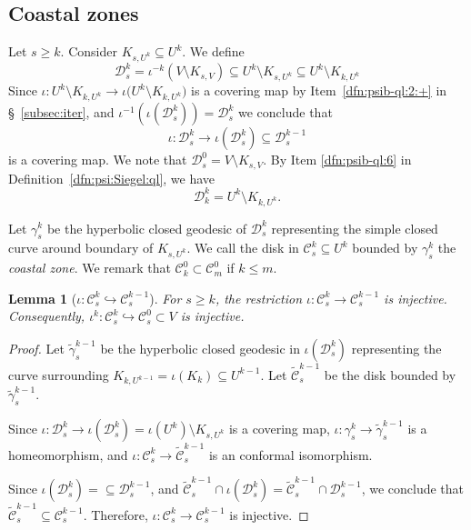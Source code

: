 \documentclass{amsart}
\newcommand{\1}{{\mathbb 1 }}
\newcommand\DD{\mathcal{D}}
\newtheorem{lem}[thm]{Lemma}
\theoremstyle{remark}
\numberwithin{equation}{section}
\theoremstyle{definition}
\newcommand{\CC}{{\mathcal C}}
\begin{document}
\subsection{Coastal zones}\label{subsec:coastal}
Let $s \geq k$. Consider $K_{s, U^k} \subseteq U^k$.
We define 
$$
\DD^k_s = \iota^{-k}(V \setminus K_{s, V}) \subseteq U^k \setminus K_{s, U^k} \subseteq U^k \setminus K_{k, U^k}
$$
Since $\iota: U^k \setminus K_{k, U^k} \longrightarrow \iota\big( U^{k}\setminus  K_{k, U^k}\big)$ is a covering map by Item~\ref{dfn:psib-ql:2:+} in \S~\ref{subsec:iter}, and $\iota^{-1}(\iota(\DD^k_s)) = \DD^k_s$ we conclude that
$$
\iota: \DD^k_s \longrightarrow \iota(\DD^k_s) \subseteq \DD^{k-1}_s
$$
is a covering map.
We note that $\DD^0_s = V \setminus K_{s, V}$. 
By Item \ref{dfn:psib-ql:6} in Definition~\ref{dfn:psi:Siegel:ql}, we have
\begin{equation}\label{eq:D^k_k}
    \DD^k_k = U^k \setminus K_{k, U^k}.
\end{equation}


Let $\gamma^k_s$ be the hyperbolic closed geodesic of $\DD^k_s$ representing the simple closed curve around boundary of $K_{s, U^k}$.
We call the disk in $\CC^k_s \subseteq U^k$ bounded by $\gamma^k_s$ the {\em coastal zone}. We remark that $\CC^0_k \subset \CC^0_m$ if $k \leq m$.

\begin{lem}[$\iota\colon \CC^k_s \hookrightarrow \CC^{k-1}_s$] \label{lem:iota|CC_k}
For $s \geq k$, the restriction $\iota: \CC^k_s \longrightarrow \CC^{k-1}_s$ is injective.
Consequently,  $\iota^k \colon \CC^k_s \hookrightarrow \CC^0_s\subset V$ is injective.
\end{lem}
\begin{proof} 
Let $\widetilde\gamma^{k-1}_s$ be the hyperbolic closed geodesic in $\iota(\DD^k_s)$ representing the curve surrounding $K_{k, U^{k-1}} = \iota(K_k) \subseteq U^{k-1}$.
Let $\widetilde\CC^{k-1}_s$ be the disk bounded by $\widetilde\gamma^{k-1}_s$.

Since $\iota: \DD^k_s \longrightarrow \iota(\DD^k_s) = \iota(U^k) \setminus K_{s, U^k}$ is a covering map, $\iota: \gamma^k_s \longrightarrow \widetilde\gamma^{k-1}_s$ is a homeomorphism, and $\iota: \CC^{k}_s \longrightarrow \widetilde\CC^{k-1}_s$ is an conformal isomorphism.

Since $\iota(\DD^k_s) = \subseteq \DD^{k-1}_s$, and $\widetilde\CC^{k-1}_s \cap \iota(\DD^k_s) = \widetilde\CC^{k-1}_s \cap \DD^{k-1}_s$, we conclude that $\widetilde\CC^{k-1}_s \subseteq \CC^{k-1}_s$.
Therefore, $\iota: \CC^k_s \longrightarrow \CC^{k-1}_s$ is injective.
\end{proof}
\end{document}
